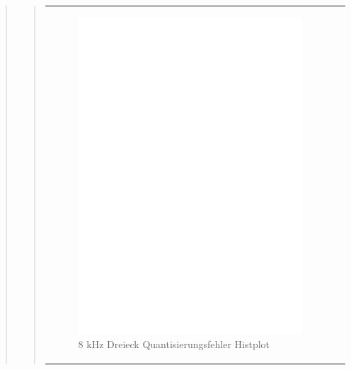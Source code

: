\begin{quote}
\begin{quote}
\begin{center}
\begin{tabular}{ll}
            \hspace{-4cm}
                \begin{minipage}{0.6\textwidth}
                    \begin{figure}[H]
                        \includegraphics[scale=0.5, trim = 16mm 70mm 16mm 85mm, clip]
                                        {Bilder/8kHz_dreieck_Quant_Hist}
                        \caption{8 kHz Dreieck Quantisierungsfehler Histplot}
                        \label{fig:8kHz_drei_Hist}
                    \end{figure}
                \end{minipage}
                

\end{tabular}
\end{center}
\end{quote}
\end{quote}
